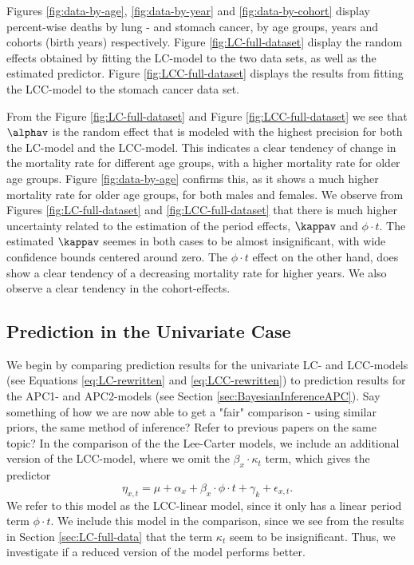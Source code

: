 \newpar Figures \ref{fig:data-by-age}, \ref{fig:data-by-year} and \ref{fig:data-by-cohort} display percent-wise deaths by lung - and stomach cancer, by age groups, years and cohorts (birth years) respectively. Figure \ref{fig:LC-full-dataset} display the random effects obtained by fitting the LC-model to the two data sets, as well as the estimated predictor. Figure \ref{fig:LCC-full-dataset} displays the results from fitting the LCC-model to the stomach cancer data set. 

\newpar From the Figure \ref{fig:LC-full-dataset} and Figure \ref{fig:LCC-full-dataset} we see that $\alphav$ is the random effect that is modeled with the highest precision for both the LC-model and the LCC-model. This indicates a clear tendency of change in the mortality rate for different age groups, with a higher mortality rate for older age groups. Figure \ref{fig:data-by-age} confirms this, as it shows a much higher mortality rate for older age groups, for both males and females. 
\newpar We observe from Figures \ref{fig:LC-full-dataset} and \ref{fig:LCC-full-dataset} that there is much higher uncertainty related to the estimation of the period effects, $\kappav$ and $\phi\cdot t$. The estimated $\kappav$ seemes in both cases to be almost insignificant, with wide confidence bounds centered around zero. The $\phi \cdot t$ effect on the other hand, does show a clear tendency of a decreasing mortality rate for higher years.  We also observe a clear tendency in the cohort-effects. 

\subsection{Prediction in the Univariate Case}
We begin by comparing prediction results for the univariate LC- and LCC-models (see Equations \ref{eq:LC-rewritten} and \ref{eq:LCC-rewritten}) to prediction results for the APC1- and APC2-models (see Section \ref{sec:BayesianInferenceAPC}).
\textcolor{myDarkGreen}{Say something of how we are now able to get a "fair" comparison - using similar priors, the same method of inference? Refer to previous papers on the same topic? }
In the comparison of the the Lee-Carter models, we include an additional version of the LCC-model, where we omit the $\beta_x\cdot \kappa_t$ term, which gives the predictor
\begin{equation}
    \eta_{x,t} = \mu + \alpha_x + \beta_x\cdot \phi \cdot t + \gamma_k + \epsilon_{x,t}.
\end{equation}
We refer to this model as the LCC-linear model, since it only has a linear period term $\phi \cdot t$. We include this model in the comparison, since we see from the results in Section \ref{sec:LC-full-data} that the term $\kappa_t$ seem to be insignificant. Thus, we investigate if a reduced version of the model performs better. 

